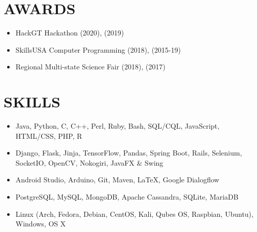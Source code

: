 \documentclass[11pt,letterpaper]{article}
\begin{document}
  
  \section*{AWARDS}

  \begin{itemize}
    \item{
      HackGT Hackathon \textemdash{}
      {}
      (2020),
      {}
      (2019)
    }



    \item{
      SkillsUSA Computer Programming
      \textemdash{}
      {}
      (2018),
      {}
      (2015-19)
    }

    \item{
      Regional Multi-state Science Fair
      \textemdash{}
      {}
      (2018),
      {}
      (2017)
    }
  \end{itemize}

  \bigskip


  \section*{SKILLS}

  \begin{itemize}
    \item{
      {}
      Java, Python, C, C++, Perl, Ruby, Bash, SQL/CQL, JavaScript, HTML/CSS, PHP, R
    }

    \item{
      {}
      Django, Flask, Jinja, TensorFlow, Pandas, Spring Boot, Rails, Selenium, SocketIO, OpenCV, Nokogiri, JavaFX \& Swing
    }

    \item{
      {}
      Android Studio, Arduino, Git, Maven, \LaTeX, Google Dialogflow
    }

    \item{
      {}
      PostgreSQL, MySQL, MongoDB, Apache Cassandra, SQLite, MariaDB
    }

    \item{
      {}
      Linux (Arch, Fedora, Debian, CentOS, Kali, Qubes OS, Raspbian, Ubuntu), Windows, OS X
    }
  \end{itemize}
\end{document}
